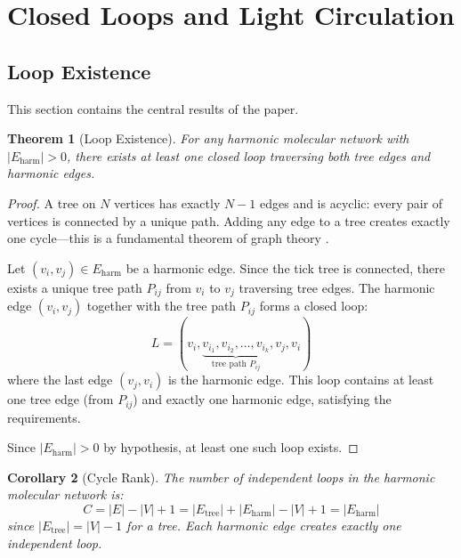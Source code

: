 \documentclass[11pt,a4paper]{article}
\newtheorem{theorem}{Theorem}[section]
\newtheorem{corollary}[theorem]{Corollary}
\theoremstyle{definition}
\theoremstyle{remark}
\begin{document}
\section{Closed Loops and Light Circulation}
\label{sec:loops}

\subsection{Loop Existence}

This section contains the central results of the paper.

\begin{theorem}[Loop Existence]
\label{thm:loop_existence}
For any harmonic molecular network with $|E_{\mathrm{harm}}| > 0$, there exists at least one closed loop traversing both tree edges and harmonic edges.
\end{theorem}

\begin{proof}
A tree on $N$ vertices has exactly $N - 1$ edges and is acyclic: every pair of vertices is connected by a unique path. Adding any edge to a tree creates exactly one cycle---this is a fundamental theorem of graph theory \citep{diestel2017}.

Let $(v_i, v_j) \in E_{\mathrm{harm}}$ be a harmonic edge. Since the tick tree is connected, there exists a unique tree path $P_{ij}$ from $v_i$ to $v_j$ traversing tree edges. The harmonic edge $(v_i, v_j)$ together with the tree path $P_{ij}$ forms a closed loop:
\begin{equation}
L = (v_i, \underbrace{v_{i_1}, v_{i_2}, \ldots, v_{i_k}}_{\text{tree path } P_{ij}}, v_j, v_i)
\label{eq:loop}
\end{equation}
where the last edge $(v_j, v_i)$ is the harmonic edge. This loop contains at least one tree edge (from $P_{ij}$) and exactly one harmonic edge, satisfying the requirements.

Since $|E_{\mathrm{harm}}| > 0$ by hypothesis, at least one such loop exists.
\end{proof}

\begin{corollary}[Cycle Rank]
\label{cor:cycle_rank}
The number of independent loops in the harmonic molecular network is:
\begin{equation}
C = |E| - |V| + 1 = |E_{\mathrm{tree}}| + |E_{\mathrm{harm}}| - |V| + 1 = |E_{\mathrm{harm}}|
\label{eq:cycle_rank}
\end{equation}
since $|E_{\mathrm{tree}}| = |V| - 1$ for a tree. Each harmonic edge creates exactly one independent loop.
\end{corollary}
\end{document}
